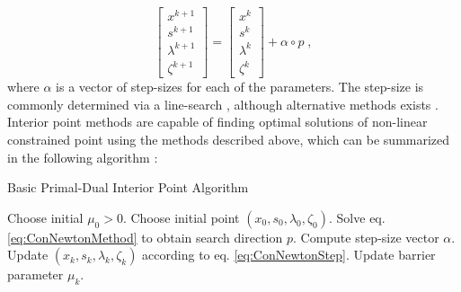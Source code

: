 \begin{equation}
\begin{bmatrix}
  x^{k+1} \\ s^{k+1} \\ \lambda^{k+1} \\ \zeta^{k+1} 
\end{bmatrix} 
=
\begin{bmatrix}
  x^{k} \\ s^{k} \\ \lambda^{k} \\ \zeta^{k} 
\end{bmatrix} 
+ \alpha \circ p \; ,
\label{eq:ConNewtonStep}
\end{equation}
where $\alpha$ is a vector of step-sizes for each of the parameters. The step-size is commonly determined via a line-search \cite{Wachter2005,Fletcher2002}, although alternative methods exists \cite{Coleman1996}.\\
Interior point methods are capable of finding optimal solutions of non-linear constrained point using the methods described above, which can be summarized in the following algorithm \cite{wright}:
\begin{algorithm}
\begin{algorithmic}
\caption{Basic Primal-Dual Interior Point Algorithm}
\State Choose initial $\mu_0 > 0$.
\State Choose initial point $(x_0 , s_0 ,  \lambda_0 , \zeta_0)$.
		\State Solve eq. \eqref{eq:ConNewtonMethod} to obtain search direction $p$.
		\State Compute step-size vector $\alpha$.
		\State Update $(x_k , s_k ,  \lambda_k , \zeta_k)$ according to eq. \eqref{eq:ConNewtonStep}.
	\EndWhile
	\State Update barrier parameter $\mu_k$.
\EndWhile
\end{algorithmic}
\end{algorithm}

